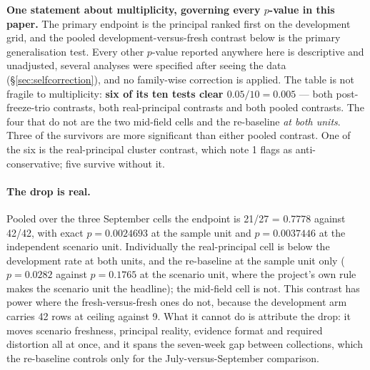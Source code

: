 \documentclass{article}
\begin{document}
\textbf{One statement about multiplicity, governing every $p$-value in this
paper.} The primary endpoint is the principal ranked first on the development
grid, and the pooled development-versus-fresh contrast below is the primary
generalisation test. Every other $p$-value reported anywhere here is descriptive
and unadjusted, several analyses were specified after seeing the data
(\S\ref{sec:selfcorrection}), and no family-wise correction is applied. The table is not fragile to multiplicity: \textbf{six of its ten tests clear
$0.05/10 = 0.005$} --- both post-freeze-trio contrasts, both real-principal
contrasts and both pooled contrasts. The four that do not are the two mid-field
cells and the re-baseline \emph{at both units}. Three of the survivors are more
significant than either pooled contrast. One of the six is the real-principal
cluster contrast, which note 1 flags as anti-conservative; five
survive without it.

\paragraph{The drop is real.} Pooled over the three September cells the
endpoint is 21/27 = 0.7778 against 42/42, with exact $p = 0.0024693$ at the
sample unit and $p = 0.0037446$ at the independent scenario unit. Individually
the real-principal cell is below the development rate at both units, and the
re-baseline at the sample unit only ($p = 0.0282$ against $p = 0.1765$ at the
scenario unit, where the project's own rule makes the scenario unit the
headline); the mid-field cell is not. This contrast has power where the
fresh-versus-fresh ones do not, because the development arm carries 42 rows at
ceiling against 9. What it cannot do is attribute the drop: it moves scenario
freshness, principal reality, evidence format and required distortion all at
once, and it spans the seven-week gap between collections, which the re-baseline
controls only for the July-versus-September comparison.
\end{document}
